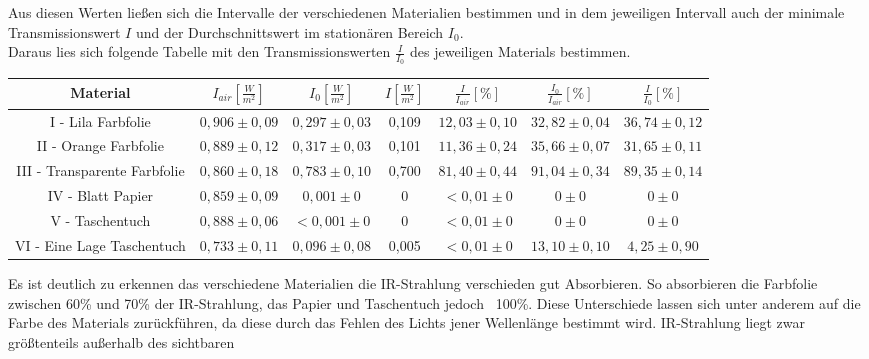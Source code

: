 \documentclass{article}
\begin{document}
            Aus diesen Werten ließen sich die Intervalle der verschiedenen Materialien bestimmen
            und in dem jeweiligen Intervall auch der minimale Transmissionswert $I$ und der Durchschnittswert
            im stationären Bereich $I_0$.\\
            Daraus lies sich folgende Tabelle mit den Transmissionswerten $\frac{I}{I_0}$ des jeweiligen Materials
            bestimmen.
            \begin{center}
                \begin{tabular}{|c|c|c|c|c|c|c|}
                    \hline
                    Material & $I_{air}[\frac{W}{m^2}] $ & $I_0[\frac{W}{m^2}]$ & $I[\frac{W}{m^2}]$ & $\frac{I}{I_{air}}[\%]$ & $\frac{I_0}{I_{air}}[\%]$ & $\frac{I}{I_0}[\%]$\\
                    \hline
                    I - Lila Farbfolie              & $0,906\pm 0,09$ & $0,297\pm 0,03$     & 0,109 & $12,03\pm 0,10$ & $32,82\pm 0,04$ & $36,74\pm 0,12$ \\
                    II - Orange Farbfolie           & $0,889\pm 0,12$ & $0,317\pm 0,03$     & 0,101 & $11,36\pm 0,24$ & $35,66\pm 0,07$ & $31,65\pm 0,11$ \\
                    III - Transparente Farbfolie    & $0,860\pm 0,18$ & $0,783\pm 0,10$     & 0,700 & $81,40\pm 0,44$ & $91,04\pm 0,34$ & $89,35\pm 0,14$ \\
                    IV - Blatt Papier               & $0,859\pm 0,09$ & $0,001\pm 0$        & 0     & $<0,01\pm 0$ & $0\pm 0 $     & $0\pm 0$     \\
                    V - Taschentuch                 & $0,888\pm 0,06$ & $<0,001\pm 0$       & 0     & $<0,01\pm 0$ & $0\pm 0 $     & $0\pm 0$     \\
                    VI - Eine Lage Taschentuch      & $0,733\pm 0,11$ & $0,096\pm 0,08$     & 0,005 & $<0,01\pm 0$ & $13,10\pm 0,10$ & $4,25\pm 0,90$  \\
                    \hline
                \end{tabular}
            \end{center}
            Es ist deutlich zu erkennen das verschiedene Materialien die IR-Strahlung verschieden
            gut Absorbieren. So absorbieren die Farbfolie zwischen 60\% und 70\% der IR-Strahlung,
            das Papier und Taschentuch jedoch ~100\%. Diese Unterschiede lassen sich unter anderem
            auf die Farbe des Materials zurückführen, da diese durch das Fehlen des Lichts jener
            Wellenlänge bestimmt wird. IR-Strahlung liegt zwar größtenteils außerhalb des sichtbaren
\end{document}
